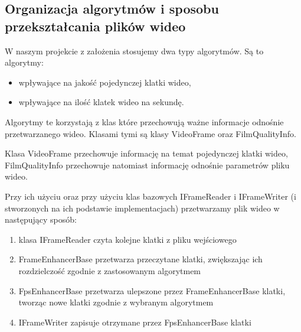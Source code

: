 \documentclass[twoside]{projektInzynierskiMS}
\begin{document}
\subsection{Organizacja algorytmów i sposobu przekształcania plików wideo}
W naszym projekcie z założenia stosujemy dwa typy algorytmów. Są to algorytmy:
\begin{itemize}
\item wpływające na jakość pojedynczej klatki wideo,
\item wpływające na ilość klatek wideo na sekundę.
\end{itemize}

Algorytmy te korzystają z klas które przechowują ważne informacje odnośnie przetwarzanego wideo. Klasami tymi są klasy VideoFrame oraz FilmQualityInfo. 

Klasa VideoFrame przechowuje informację na temat pojedynczej klatki wideo, FilmQualityInfo przechowuje natomiast informację odnośnie parametrów pliku wideo. 

Przy ich użyciu oraz przy użyciu klas bazowych IFrameReader i IFrameWriter (i stworzonych na ich podstawie implementacjach) przetwarzamy plik wideo w następujący sposób:
\begin{enumerate}
\item klasa IFrameReader czyta kolejne klatki z pliku wejściowego
\item FrameEnhancerBase przetwarza przeczytane klatki, zwiększając ich rozdzielczość zgodnie z zastosowanym algorytmem
\item FpsEnhancerBase przetwarza ulepszone przez FrameEnhancerBase klatki, tworząc nowe klatki zgodnie z wybranym algorytmem
\item IFrameWriter zapisuje otrzymane przez FpsEnhancerBase klatki
\end{enumerate}
\end{document}
